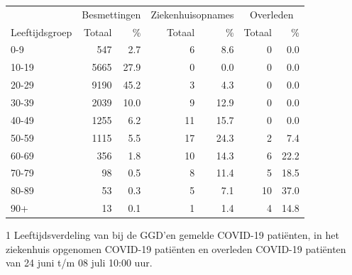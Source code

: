 \documentclass[
  english,
  man,floatsintext]{apa6}
\begin{document}
\begin{table}
\centering\begingroup\fontsize{11}{13}\selectfont

\begin{threeparttable}
\begin{tabular}{lrrrrrr}
\toprule
\multicolumn{1}{c}{ } & \multicolumn{2}{c}{Besmettingen} & \multicolumn{2}{c}{Ziekenhuisopnames} & \multicolumn{2}{c}{Overleden} \\
\cmidrule(l{3pt}r{3pt}){2-3} \cmidrule(l{3pt}r{3pt}){4-5} \cmidrule(l{3pt}r{3pt}){6-7}
Leeftijdsgroep & Totaal & \% & Totaal & \% & Totaal & \%\\
\midrule
0-9 & 547 & 2.7 & 6 & 8.6 & 0 & 0.0\\
10-19 & 5665 & 27.9 & 0 & 0.0 & 0 & 0.0\\
20-29 & 9190 & 45.2 & 3 & 4.3 & 0 & 0.0\\
30-39 & 2039 & 10.0 & 9 & 12.9 & 0 & 0.0\\
40-49 & 1255 & 6.2 & 11 & 15.7 & 0 & 0.0\\
50-59 & 1115 & 5.5 & 17 & 24.3 & 2 & 7.4\\
60-69 & 356 & 1.8 & 10 & 14.3 & 6 & 22.2\\
70-79 & 98 & 0.5 & 8 & 11.4 & 5 & 18.5\\
80-89 & 53 & 0.3 & 5 & 7.1 & 10 & 37.0\\
90+ & 13 & 0.1 & 1 & 1.4 & 4 & 14.8\\
\bottomrule
\end{tabular}
\begin{tablenotes}
\item[1] Leeftijdsverdeling van bij de GGD’en gemelde COVID-19 patiënten, in het ziekenhuis opgenomen COVID-19 patiënten en overleden COVID-19 patiënten van 24 juni t/m 08 juli 10:00 uur.
\end{tablenotes}
\end{threeparttable}
\endgroup{}
\end{table}

\newpage
\end{document}
